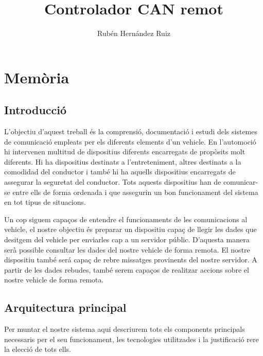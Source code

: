\documentclass{tfgitic}[2024/07/01]
\title{
  Controlador CAN remot
}
\author{Rubén Hernández Ruiz}
\begin{document}
\part{Memòria}

\chapter{Introducció}
\label{cap:intro}

L’objectiu d’aquest treball és la comprensió, documentació i estudi dels sistemes de comunicació empleats per els diferents elements d’un vehicle. 
En l’automoció hi intervenen multitud de dispositius diferents encarregats de propòsits molt diferents. Hi ha dispositius destinats a l'entreteniment, 
altres destinats a la comodidad del conductor i també hi ha aquells dispositius encarregats de assegurar la seguretat del conductor. Tots aquests 
dispositius han de comunicar-se entre ells de forma ordenada i que assegurin un bon funcionament del sistema en tot tipus de situacions. 

Un cop siguem capaços de entendre el funcionaments de les comunicacions al vehicle, el nostre objectiu és preparar un dispositiu capaç de llegir 
les dades que desitgem del vehicle per enviarles cap a un servidor públic. D’aquesta manera serà possible consultar les dades del nostre vehicle de 
forma remota. El nostre dispositiu també será capaç de rebre missatges provinents del nostre servidor. A partir de les dades rebudes, també serem 
capaços de realitzar accions sobre el nostre vehicle de forma remota.


\chapter{Arquitectura principal}

Per muntar el nostre sistema aqui descriurem tots els components principals necessaris per el seu funcionament, les tecnologies utilitzades i la justificació 
rere la elecció de tots ells. 
\end{document}
